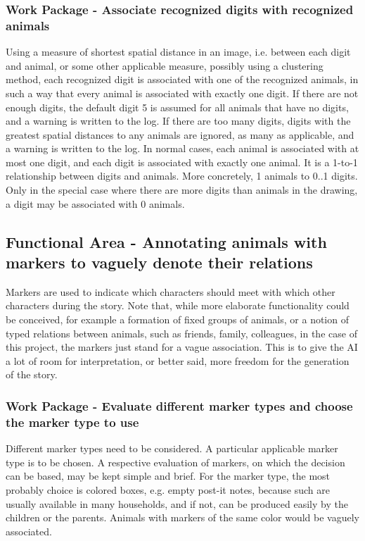 \subsubsection{Work Package - Associate recognized digits with recognized animals}
Using a measure of shortest spatial distance in an image, i.e. between each digit and animal, or some other applicable measure, possibly using a clustering method, each recognized digit is associated with one of the recognized animals, in such a way that every animal is associated with exactly one digit.
If there are not enough digits, the default digit 5 is assumed for all animals that have no digits, and a warning is written to the log. If there are too many digits, digits with the greatest spatial distances to any animals are ignored, as many as applicable, and a warning is written to the log.
In normal cases, each animal is associated with at most one digit, and each digit is associated with exactly one animal.
It is a 1-to-1 relationship between digits and animals.
More concretely, 1 animals to 0..1 digits.
Only in the special case where there are more digits than animals in the drawing, a digit may be associated with 0 animals.

\subsection{Functional Area - Annotating animals with markers to vaguely denote their relations}
Markers are used to indicate which characters should meet with which other characters during the story.
Note that, while more elaborate functionality could be conceived, for example a formation of fixed groups of animals, or a notion of typed relations between animals, such as friends, family, colleagues, in the case of this project, the markers just stand for a vague association.
This is to give the AI a lot of room for interpretation, or better said, more freedom for the generation of the story.

\subsubsection{Work Package - Evaluate different marker types and choose the marker type to use}
Different marker types need to be considered.
A particular applicable marker type is to be chosen.
A respective evaluation of markers, on which the decision can be based, may be kept simple and brief.
For the marker type, the most probably choice is colored boxes, e.g. empty post-it notes, because such are usually available in many households, and if not, can be produced easily by the children or the parents.
Animals with markers of the same color would be vaguely associated.

